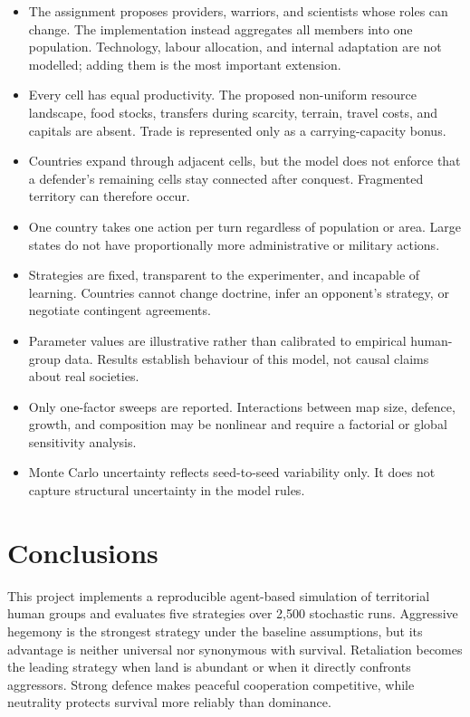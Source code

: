 \documentclass[10pt,twocolumn]{article}
\begin{document}
\begin{itemize}
\item The assignment proposes providers, warriors, and scientists whose roles
can change.  The implementation instead aggregates all members into one
population.  Technology, labour allocation, and internal adaptation are not
modelled; adding them is the most important extension.
\item Every cell has equal productivity.  The proposed non-uniform resource
landscape, food stocks, transfers during scarcity, terrain, travel costs, and
capitals are absent.  Trade is represented only as a carrying-capacity bonus.
\item Countries expand through adjacent cells, but the model does not enforce
that a defender's remaining cells stay connected after conquest.  Fragmented
territory can therefore occur.
\item One country takes one action per turn regardless of population or area.
Large states do not have proportionally more administrative or military
actions.
\item Strategies are fixed, transparent to the experimenter, and incapable
of learning.  Countries cannot change doctrine, infer an opponent's strategy,
or negotiate contingent agreements.
\item Parameter values are illustrative rather than calibrated to empirical
human-group data.  Results establish behaviour of this model, not causal
claims about real societies.
\item Only one-factor sweeps are reported.  Interactions between map size,
defence, growth, and composition may be nonlinear and require a factorial or
global sensitivity analysis.
\item Monte Carlo uncertainty reflects seed-to-seed variability only.  It
does not capture structural uncertainty in the model rules.
\end{itemize}

\section{Conclusions}

This project implements a reproducible agent-based simulation of territorial
human groups and evaluates five strategies over 2,500 stochastic runs.
Aggressive hegemony is the strongest strategy under the baseline assumptions,
but its advantage is neither universal nor synonymous with survival.
Retaliation becomes the leading strategy when land is abundant or when it
directly confronts aggressors.  Strong defence makes peaceful cooperation
competitive, while neutrality protects survival more reliably than dominance.
\end{document}
